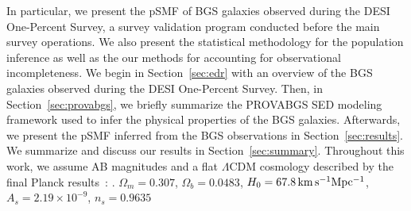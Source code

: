 In particular, we present the pSMF of BGS galaxies observed during the DESI
One-Percent Survey, a survey validation program conducted before the main
survey operations. 
We also present the statistical methodology for the population inference as
well as the our methods for accounting for observational incompleteness. 
We begin in Section~\ref{sec:edr} with an overview of the BGS galaxies observed
during the DESI One-Percent Survey. 
Then, in Section~\ref{sec:provabgs}, we briefly summarize the PROVABGS SED
modeling framework used to infer the physical properties of the BGS galaxies.
Afterwards, we present the pSMF inferred from the BGS observations in
Section~\ref{sec:results}. 
We summarize and discuss our results in Section~\ref{sec:summary}.
Throughout this work, we assume AB magnitudes and a flat $\Lambda$CDM cosmology
described by the final Planck results~\citep{planckcollaboration2014a}: .
$\Omega_m = 0.307$, $\Omega_b = 0.0483$, $H_0=67.8\,{\rm km\,s^{-1} Mpc^{-1}}$,
$A_s=2.19\times10^{-9}$, $n_s=0.9635$
